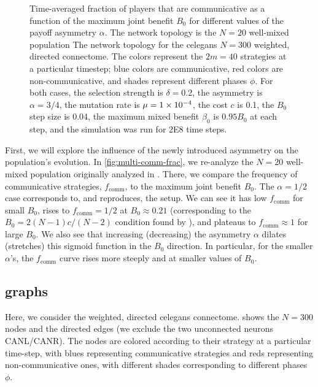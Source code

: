 \documentclass[pdflatex,lineno,referee,sn-mathphys-ay]{sn-jnl}
\begin{document}
\begin{figure}
  \centering
  
  \caption{
    Time-averaged fraction of players that are communicative as a function
    of the maximum joint benefit $B_0$
    for different values of the payoff asymmetry $\alpha$.
    The network topology is the
    $N=20$ well-mixed population
    The network topology for the \gls{celegans}
    $N=300$ weighted, directed connectome.
    The colors represent the $2m = 40$ strategies
    at a particular timestep;
    blue colors are communicative,
    red colors are non-communicative,
    and shades represent different phases $\phi$.
    For both cases,
    the selection strength is $\delta=0.2$,
    the asymmetry is $\alpha=3/4$,
    the mutation rate is $\mu=\num{1E-4}$,
    the cost $c$ is \num{0.1},
    the $B_0$ step size is \num{0.04},
    the maximum mixed benefit $\beta_0$ is $\num{0.95} B_0$ at each step,
    and the simulation was run for \num{2E8} time steps.
  }
  \label{fig:graph_multi-comm-frac}
\end{figure}

First, we will explore the influence of the newly introduced asymmetry
on the population's evolution.
In \cref{fig:multi-comm-frac}, we re-analyze the $N=20$ well-mixed population
originally analyzed in \citet{tripp2022evolutionary}.
There, we compare the frequency of communicative strategies, $f_{\text{comm}}$,
to the maximum joint benefit $B_0$.
The $\alpha=1/2$ case corresponds to, and reproduces,
the \citet{tripp2022evolutionary} setup.
We can see it has low $f_{\text{comm}}$ for small $B_0$,
rises to $f_{\text{comm}} = 1/2$ at $B_0 \approx 0.21$
(corresponding to the $B_0 = 2 (N-1) c/(N-2)$ condition
found by \citet{tripp2022evolutionary}),
and plateaus to $f_{\text{comm}} \approx 1$ for large $B_0$.
We also see that increasing (decreasing)
the asymmetry $\alpha$ dilates (stretches) this sigmoid function
in the $B_0$ direction.
In particular, for the smaller $\alpha$'s, the $f_{\text{comm}}$ curve
rises more steeply and at smaller values of $B_0$.

\subsection{ graphs}
\label{sec:elegans_graph}

Here, we consider the weighted, directed \gls{celegans} connectome.
 shows the $N = 300$ nodes and the directed edges
(we exclude the two unconnected neurons CANL/CANR).
The nodes are colored according to their strategy at a particular time-step,
with blues representing communicative strategies
and reds representing non-communicative ones,
with different shades corresponding to different phases $\phi$.
\end{document}
